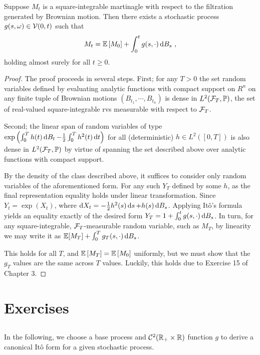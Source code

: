\documentclass{article}
\begin{document}
\begin{theorem}
  Suppose \(M_t\) is a square-integrable martinagle with respect to the filtration generated by Brownian motion. Then there exists a stochastic process \(g(s,\omega)\in \mathcal{V}(0, t)\) such that
  \[
    M_t=\operatorname{\mathbb{E}}\left[{M_0}\right]+\int_0^tg(s,\cdot)\mathop{\mathrm{d} B_s }\,\,,
  \]
  holding almost surely for all \(t\ge 0\). 
\end{theorem}
\begin{proof}
  The proof proceeds in several steps. First; for any \(T>0\) the set random variables defined by evaluating analytic functions with compact support on \(R^n\) on any finite tuple of Brownian motions \((B_{t_1},\cdots,B_{t_n})\) is dense in \(L^2(\mathcal{F}_T,\operatorname{\mathbb{P}})\), the set of real-valued square-integrable rvs measurable with respect to \(\mathcal{F}_T\).

  Second; the linear span of random variables of type \(\exp\left({\int_0^Th(t)\mathop{\mathrm{d} B_t }-\frac{1}{2}\int_0^Th^2(t)\mathop{\mathrm{d} t }}\right)\) for all (deterministic) \(h\in L^2([0,T])\) is also dense in \(L^2(\mathcal{F}_T, \operatorname{\mathbb{P}})\) by virtue of spanning the set described above over analytic functions with compact support.

  By the density of the class described above, it suffices to consider only random variables of the aforementioned form. For any such \(Y_T\) defined by some \(h\), as the final representation equality holds under linear transformation. Since \(Y_t=\exp(X_t)\), where \(\mathop{\mathrm{d} X_t }=-\frac{1}{2}h^2(s)\mathop{\mathrm{d} s }+h(s)\mathop{\mathrm{d} B_s }\). Applying It\^{o}'s formula yields an equality exactly of the desired form \(Y_T=1 + \int_0^tg(s,\cdot)\mathop{\mathrm{d} B_s }\). In turn, for any square-integrable, \(\mathcal{F}_T\)-measurable random variable, such as \(M_T\), by linearity we may write it as \(\operatorname{\mathbb{E}}[M_T]+\int_0^Tg_{T}(s,\cdot)\mathop{\mathrm{d} B_s }\).

  This holds for all \(T\), and \(\operatorname{\mathbb{E}}\left[{M_T}\right]=\operatorname{\mathbb{E}} \left[{M_0}\right]\) uniformly, but we must show that the \(g_T\) values are the same across \(T\) values. Luckily, this holds due to Exercise 15 of Chapter 3.
  \end{proof}


  \section{Exercises}

  \subsection{}

  In the following, we choose a base process and \(\mathcal{C}^2(\mathbb{R}_+\times \mathbb{R})\) function \(g\) to derive a canonical It\^{o} form for a given stochastic process.
\end{document}
